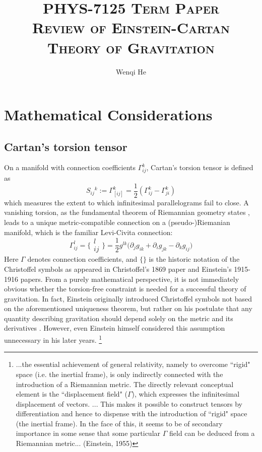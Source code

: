 \documentclass[12pt]{article}
\title{\textsc{\Large{PHYS-7125 Term Paper} \\ \LARGE{Review of Einstein-Cartan Theory of Gravitation}}}
\author{Wenqi He}
\begin{document}
\sloppy
\maketitle
\section{Mathematical Considerations}
\subsection{Cartan's torsion tensor}
On a manifold with connection coefficients $\Gamma^k_{ij}$, Cartan's torsion tensor is defined as
\[ S_{ij}{}^k := \Gamma^k_{[ij]} = \frac{1}{2}(\Gamma^k_{ij} - \Gamma^k_{ji})\]
which measures the extent to which infinitesimal parallelograms fail to close. A vanishing torsion, as the fundamental theorem of Riemannian geometry states \cite{nlab:fundamental_theorem_of_riemannian_geometry}, leads to a unique metric-compatible connection on a (pseudo-)Riemanian manifold, which is the familiar Levi-Civita connection:
\[ \Gamma^l_{ij} = \{\substack{l\\ij}\} = \frac{1}{2}g^{lk}\Big(\partial_j g_{ik} + \partial_i g_{jk} - \partial_k g_{ij} \Big)\]
Here $\Gamma$ denotes connection coefficients, and $\{\}$ is the historic notation of the Christoffel symbols as appeared in Christoffel's 1869 paper and Einstein's 1915-1916 papers. From a purely mathematical perspective, it is not immediately obvious whether the torsion-free constraint is needed for a successful theory of gravitation. In fact, Einstein originally introduced Christoffel symbols not based on the aforementioned uniqueness theorem, but rather on his postulate that any quantity describing gravitation should depend solely on the metric and its derivatives \cite{einstein1916foundation}. However, even Einstein himself considered this assumption unnecessary in his later years. \footnote{...the essential achievement of general relativity, namely to overcome ``rigid" space (i.e. the inertial frame), is only indirectly connected with the introduction of a Riemannian metric. The directly relevant conceptual element is the ``displacement field" ($\Gamma$), which expresses the infinitesimal displacement of vectors. ... This makes it possible to construct tensors by differentiation and hence to dispense with the introduction of ``rigid" space (the inertial frame). In the face of this, it seems to be of secondary importance in some sense that some particular $\Gamma$ field can be deduced from a Riemannian metric... (Einstein, 1955)}
\end{document}
